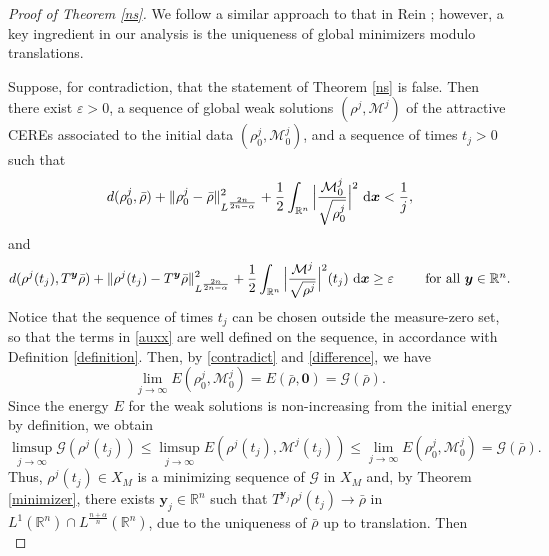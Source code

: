 \documentclass[reqno,11pt]{amsart}
\numberwithin{equation}{section}
\theoremstyle{definition}
\def\v{\varepsilon}
\def\dd{{\, \rm d}}
\begin{document}
\begin{proof}[Proof of Theorem \ref{ns}]
We follow a similar approach to that in Rein \cite{Rein_2003}; however,
a key ingredient in our analysis is the uniqueness of global minimizers modulo translations.

Suppose, for contradiction, that the statement of Theorem \ref{ns} is false. 
Then there exist $\varepsilon > 0$, a sequence of global weak solutions $(\rho^j,\mathcal{M}^j)$ of the attractive CEREs associated to the initial data $(\rho^j_0,\mathcal{M}^j_0)$,
and a sequence of times $t_j > 0$ such that
\begin{align}\label{contradict}
d(\rho^j_0,\bar{\rho})+ \| \rho^j_0 - \bar{\rho} \|_{L^\frac{2n}{2n - \alpha}}^2
+\frac{1}{2}\int_{\mathbb{R}^n}\Big|\frac{\mathcal{M}^j_0}{\sqrt{\rho^j_0}}\Big|^2\,\dd \boldsymbol{x}<\frac{1}{j},
\end{align}
and
\begin{align}\label{auxx}
d(\rho^j(t_j),T^{\boldsymbol{y}}\bar{\rho})
+ \| \rho^j(t_j) - T^{\boldsymbol{y}} \bar{\rho} \|_{L^\frac{2n}{2n - \alpha}}^2
+\frac{1}{2}\int_{\mathbb{R}^n}\Big|\frac{\mathcal{M}^j}{\sqrt{\rho^j}}\Big|^2(t_j) \,\dd \boldsymbol{x}
\geq \v \qquad\,\,\mbox{for all $\boldsymbol{y} \in \mathbb{R}^n$.}
\end{align}
Notice that the sequence of times $t_j$ can be chosen outside the measure-zero set, so that
the terms in \eqref{auxx} are well defined on the sequence, in accordance with Definition \ref{definition}.
Then, by \eqref{contradict} and \eqref{difference}, we have
\begin{equation*}
    \lim_{j \to \infty} E(\rho^j_0,\mathcal{M}^j_0) = E(\bar{\rho},\boldsymbol{0}) = \mathcal{G}(\bar{\rho}).
\end{equation*}
Since the energy $E$ for the weak solutions is non-increasing from the initial energy 
by definition, we obtain 
\begin{equation*}
    \limsup_{j \to \infty} \mathcal{G}(\rho^j(t_j)) \leq \limsup_{j \to \infty} E(\rho^j(t_j),\mathcal{M}^j(t_j)) \leq \lim_{j \to \infty} E(\rho^j_0,\mathcal{M}^j_0) = \mathcal{G}(\bar{\rho}).
\end{equation*}
Thus, $\rho^j(t_j) \in X_M$ is a minimizing sequence of $\mathcal{G}$ in $X_M$ and, by Theorem \ref{minimizer}, 
there exists $\boldsymbol{y}_j \in \mathbb{R}^n$ such that $T^{\boldsymbol{y}_j} \rho^j(t_j) \to \bar{\rho}$ 
in $L^1(\mathbb{R}^n) \cap L^\frac{n + \alpha}{n}(\mathbb{R}^n)$, 
due to the uniqueness of $\bar{\rho}$ up to translation. 
Then
\begin{equation*}

\end{equation*}
\end{proof}
\end{document}
